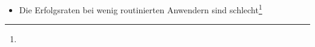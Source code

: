 {\begin{itemize}
{  %
  Jones2004, %
  Pelucio1997, %
  Jemmett2003, %
  Katz2001, %
  Erc2010Sek04De,
  }
  \item Die Erfolgsraten bei wenig routinierten Anwendern
  sind schlecht\footnote{}
\end{itemize}}
